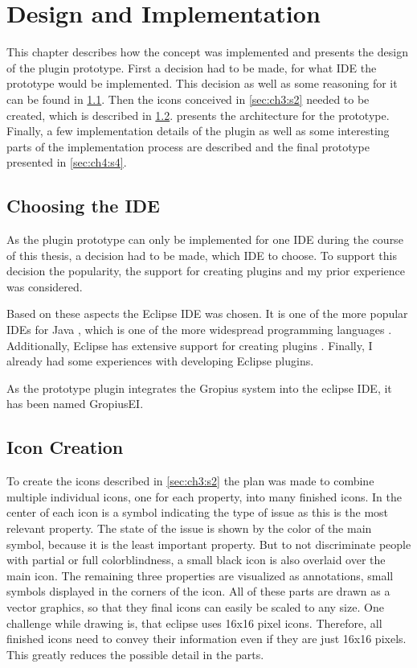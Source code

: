 
\chapter{Design and Implementation}
\label{chap:ch4}
This chapter describes how the concept was implemented and presents the design of the plugin prototype.
First a decision had to be made, for what \gls{IDE} the prototype would be implemented.
This decision as well as some reasoning for it can be found in \cref{sec:ch4:s1}.
Then the icons conceived in \cref{sec:ch3:s2} needed to be created, which is described in \cref{sec:ch4:s2}.
 presents the architecture for the prototype.
Finally, a few implementation details of the plugin as well as some interesting parts of the implementation process are described 
and the final prototype presented in \cref{sec:ch4:s4}.

\section{Choosing the IDE}
\label{sec:ch4:s1}
As the plugin prototype can only be implemented for one \gls{IDE} during the course of this thesis,
a decision had to be made, which \gls{IDE} to choose.
To support this decision the popularity, the support for creating plugins and my prior experience was considered.

Based on these aspects the Eclipse \gls{IDE} \cite{burnette2005eclipse} was chosen.
It is one of the more popular \glspl{IDE} for Java \cite{geer2005eclipse}, 
which is one of the more widespread programming languages \cite{delorey2007programming}.
Additionally, Eclipse has extensive support for creating plugins \cite{clayberg2006eclipse}.
Finally, I already had some experiences with developing Eclipse plugins.

As the prototype plugin integrates the Gropius system into the eclipse \gls{IDE}, it has been named \gls{GropiusEI}.

\section{Icon Creation}
\label{sec:ch4:s2}
To create the icons described in \cref{sec:ch3:s2} the plan was made to combine multiple individual icons, one for each property, into many finished icons.
In the center of each icon is a symbol indicating the type of issue as this is the most relevant property.
The state of the issue is shown by the color of the main symbol, because it is the least important property.
But to not discriminate people with partial or full colorblindness, a small black icon is also overlaid over the main icon.
The remaining three properties are visualized as annotations, small symbols displayed in the corners of the icon.
All of these parts are drawn as a vector graphics, so that they final icons can easily be scaled to any size.
One challenge while drawing is, that eclipse uses 16x16 pixel icons.
Therefore, all finished icons need to convey their information even if they are just 16x16 pixels.
This greatly reduces the possible detail in the parts.

